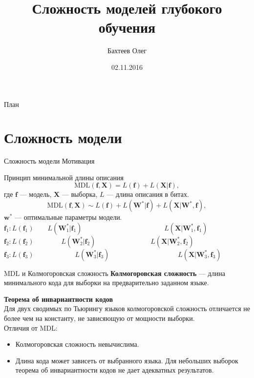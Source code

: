 \documentclass[10pt,pdf,utf8,russian,aspectratio=169]{beamer}
\title[Сложность модели]{Сложность моделей глубокого обучения}
\author{Бахтеев Олег}
\institute{МФТИ}
\date{02.11.2016}
\begin{document}
\begin{frame}
  \titlepage
\end{frame}

\begin{frame}{План}
  \tableofcontents
\end{frame}

\section{Сложность модели}
\begin{frame}{Сложность модели}
Мотивация
\end{frame}


\begin{frame}{Принцип минимальной длины описания}
\[
\text{MDL}(\mathbf{f}, \mathbf{X}) = L(\mathbf{f}) + L(\mathbf{X}|\mathbf{f}),
\]
где $\mathbf{f}$ --- модель, $\mathbf{X}$ --- выборка, $L$ --- длина описания в битах.
\\
\[
\text{MDL}(\mathbf{f}, \mathbf{X}) \sim L(\mathbf{f}) + L(\mathbf{W}^*| \mathbf{f}) + L(\mathbf{X}|\mathbf{W}^*, \mathbf{f}),
\]
$\mathbf{w}^*$ --- оптимальные параметры модели.\\


$\mathbf{f}_1: L(\mathbf{f}_1)\qquad L(\mathbf{W}_1^*| \mathbf{f}_1) \qquad \qquad \qquad \qquad \qquad	\qquad L(\mathbf{X}|\mathbf{W}_1^*, \mathbf{f}_1) $\\
$\mathbf{f}_2: L(\mathbf{f}_2)\qquad \qquad L(\mathbf{W}_2^*| \mathbf{f}_2) \qquad \qquad \qquad \qquad L(\mathbf{X}|\mathbf{W}_2^*, \mathbf{f}_2) $\\
$\mathbf{f}_3: L(\mathbf{f}_3)\qquad \qquad \qquad L(\mathbf{W}_3^*| \mathbf{f}_3) \qquad \qquad \qquad \qquad \qquad L(\mathbf{X}|\mathbf{W}_3^*, \mathbf{f}_3) $

\end{frame}

\begin{frame}{MDL и Колмогоровская сложность}
\textbf{Колмогоровская сложность} --- длина минимального кода для выборки на предварительно заданном языке.

\textbf{Теорема об инвариантности кодов}\\
Для двух сводимых по Тьюрингу языков колмогоровской сложность  отличается не более чем на константу, не зависяющую от мощности выборки.\\

Отличия от MDL:
\begin{itemize}
\item Колмогоровская сложность невычислима.
\item Длина кода может зависеть от выбранного языка. Для небольших выборок теорема об инвариантности кодов не дает адекватных результатов.
\end{itemize}
\end{frame}
\end{document}
